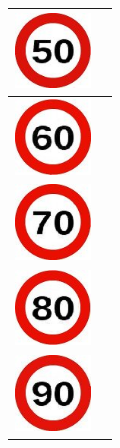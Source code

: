 \begin{table}[H]
\begin{center}
\begin{tabular}{|p{2cm}|p{8cm}|}
      \hline \includegraphics[width=2cm]{../imagenes/5.jpg} & \vspace*{-.8in}{Velocidad fijada a 50*.} \\
      \hline \includegraphics[width=2cm]{../imagenes/6.jpg} & \vspace*{-.8in}{Velocidad fijada a 60*.} \\
      \hline \includegraphics[width=2cm]{../imagenes/7.jpg} & \vspace*{-.8in}{Velocidad fijada a 70*.} \\
      \hline \includegraphics[width=2cm]{../imagenes/8.jpg} & \vspace*{-.8in}{Velocidad fijada a 80*.} \\
      \hline \includegraphics[width=2cm]{../imagenes/9.jpg} & \vspace*{-.8in}{Velocidad fijada a 90*.} \\
      \hline
   \end{tabular}
  \end{center}
\end{table}

